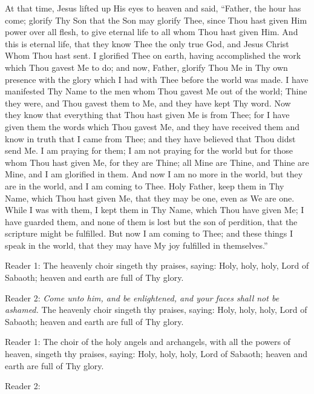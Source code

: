 \documentclass[twoside, letterpaper, 12pt]{report}
\begin{document}
\begin{maybetwocolumns}
  At that time, Jesus lifted up His eyes to heaven and said, “Father, the hour has come; glorify
  Thy Son that the Son may glorify Thee, since Thou hast given Him power over all flesh, to give
  eternal life to all whom Thou hast given Him. And this is eternal life, that they know Thee the
  only true God, and Jesus Christ Whom Thou hast sent. I glorified Thee on earth, having
  accomplished the work which Thou gavest Me to do; and now, Father, glorify Thou Me in Thy
  own presence with the glory which I had with Thee before the world was made. I have manifested
  Thy Name to the men whom Thou gavest Me out of the world; Thine they were, and Thou gavest
  them to Me, and they have kept Thy word. Now they know that everything that Thou hast given
  Me is from Thee; for I have given them the words which Thou gavest Me, and they have received
  them and know in truth that I came from Thee; and they have believed that Thou didst send Me. I
  am praying for them; I am not praying for the world but for those whom Thou hast given Me, for
  they are Thine; all Mine are Thine, and Thine are Mine, and I am glorified in them. And now I
  am no more in the world, but they are in the world, and I am coming to Thee. Holy Father, keep
  them in Thy Name, which Thou hast given Me, that they may be one, even as We are one. While
  I was with them, I kept them in Thy Name, which Thou have given Me; I have guarded them, and
  none of them is lost but the son of perdition, that the scripture might be fulfilled. But now I am
  coming to Thee; and these things I speak in the world, that they may have My joy fulfilled in
  themselves.”
\end{maybetwocolumns}

\begin{reader}
\item[Reader 1:] The heavenly choir singeth thy praises, saying:
  Holy, holy, holy, Lord of Sabaoth; heaven and earth are full of Thy glory.

\item[Reader 2:] \emph{Come unto him, and be enlightened,
               and your faces shall not be ashamed.}
  The heavenly choir singeth thy praises, saying:
  Holy, holy, holy, Lord of Sabaoth; heaven and earth are full of Thy glory.

\item[Reader 1:] \emph{\glory}
  The choir of the holy angels and archangels,
  with all the powers of heaven, singeth thy praises, saying:
  Holy, holy, holy, Lord of Sabaoth; heaven and earth are full of Thy glory.

\item[Reader 2:]\emph{\nowandever}
\end{reader}
\end{document}
